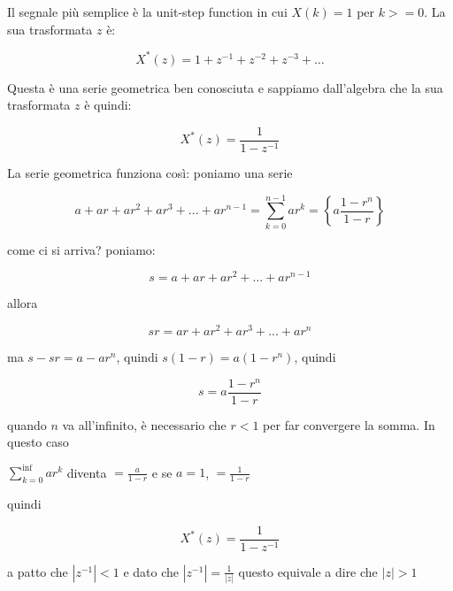     Il segnale pi\`u semplice \`e la unit-step function in cui $X(k) = 1$ per $k >= 0$.
		La sua trasformata $z$ \`e:

		 \begin{equation}
						 X^{*}(z) = 1 + z^{-1} + z^{-2} + z^{-3} + \ldots
		 \end{equation}

    Questa \`e una serie geometrica ben conosciuta e sappiamo dall'algebra che
    la sua trasformata $z$ \`e quindi:

		 \begin{equation}
			 X^{*}(z) = \frac{1}{1-z^{-1}}
		 \end{equation}

   La serie geometrica funziona cos\`i: poniamo una serie

		 \begin{equation}
			a + ar + ar^{2} + ar^{3} + ... + ar^{n-1} = \sum_{k=0}^{n-1}{ar^{k}} =  \left\{ a\frac{1-r^{n}}{1 - r} \right\}
		 \end{equation}

   come ci si arriva? poniamo:

		 \begin{equation}
    s = a + ar + ar^{2} + \ldots + ar^{n-1}
		 \end{equation}

   allora 

		 \begin{equation}
    sr = ar + ar^{2} + ar^{3} + ... + ar^{n}
		 \end{equation}

   ma $s - sr = a - ar^{n}$, quindi $s(1 - r) = a(1 - r^{n})$, quindi

		 \begin{equation}
				s = a \frac{1 - r^{n}}{1 - r}
		 \end{equation}

   quando $n$ va all'infinito, \`e necessario che $r < 1$ per far convergere la somma. In questo caso

	 $\sum_{k=0}^{\inf}{ar^{k}}$ diventa $=\frac{a}{1 - r}$ e se $a = 1$, $= \frac{1}{1 - r}$

   quindi 

		 \begin{equation}
			  X^{*}(z) = \frac{1}{1-z^{-1}}
		 \end{equation}

   a patto che $|z^{-1}| < 1$ e dato che $|z^{-1}| = \frac{1}{|z|}$ questo equivale a dire che $|z| > 1$

